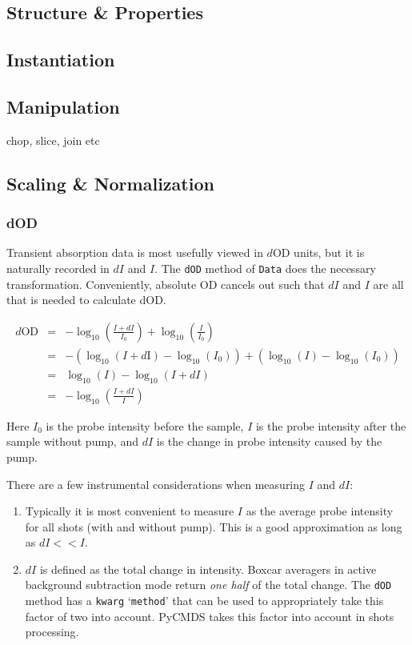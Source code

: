 \subsection{Structure \& Properties}

\subsection{Instantiation}\label{section:instantiation}

\subsection{Manipulation}

chop, slice, join etc

\subsection{Scaling \& Normalization}

\subsubsection{dOD}

Transient absorption data is most usefully viewed in $d$OD units, but it is naturally recorded in $dI$ and $I$. The \texttt{dOD} method of \texttt{Data} does the necessary transformation. Conveniently, absolute OD cancels out such that $dI$ and $I$ are all that is needed to calculate dOD.

\begin{eqnarray}
	d\mathrm{OD} &=& -\log_{10}\left(\frac{I+dI}{I_0}\right) +  \log_{10}\left(\frac{I}{I_0}\right)\\
	&=& -\left(\log_{10}(I+d\mathrm{I})-\log_{10}(I_0)\right)+\left(\log_{10}(I)-\log_{10}(I_0)\right) \\
	&=& \log_{10}(I)-\log_{10}(I+dI) \\
	&=& -\log_{10}\left(\frac{I+dI}{I}\right)
\end{eqnarray}

Here $I_0$ is the probe intensity before the sample, $I$ is the probe intensity after the sample without pump, and $dI$ is the change in probe intensity caused by the pump.

There are a few instrumental considerations when measuring $I$ and $dI$:
\begin{enumerate}
	\item Typically it is most convenient to measure $I$ as the average probe intensity for all shots (with and without pump). This is a good approximation as long as $dI<<I$.
	\item $dI$ is defined as the total change in intensity. Boxcar averagers in active background subtraction mode return \textit{one half} of the total change. The \texttt{dOD} method has a \texttt{kwarg} `\texttt{method}' that can be used to appropriately take this factor of two into account. PyCMDS takes this factor into account in shots processing.
\end{enumerate}






